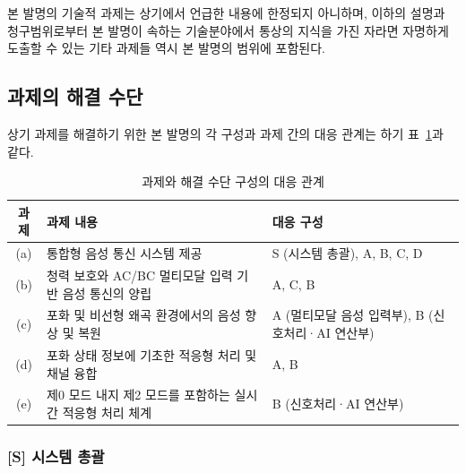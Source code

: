 \documentclass{article}
\begin{document}
본 발명의 기술적 과제는 상기에서 언급한 내용에 한정되지 아니하며, 이하의 설명과 청구범위로부터 본 발명이 속하는 기술분야에서 통상의 지식을 가진 자라면 자명하게 도출할 수 있는 기타 과제들 역시 본 발명의 범위에 포함된다.


\subsection{과제의 해결 수단}


상기 과제를 해결하기 위한 본 발명의 각 구성과 과제 간의 대응 관계는 하기 표~\ref{tab:task_solution_map}과 같다.

\begin{table}[!h]
    \centering
    \renewcommand{\arraystretch}{1.3}
    \begin{tabular}{c|l|l}
        \hline
        \textbf{과제} & \textbf{과제 내용} & \textbf{대응 구성} \\
        \hline\hline
        (a) & 통합형 음성 통신 시스템 제공 & S (시스템 총괄), A, B, C, D \\
        \hline
        (b) & 청력 보호와 AC/BC 멀티모달 입력 기반 음성 통신의 양립 & A, C, B \\
        \hline
        (c) & 포화 및 비선형 왜곡 환경에서의 음성 향상 및 복원 & A (멀티모달 음성 입력부), B (신호처리·AI 연산부) \\
        \hline
        (d) & 포화 상태 정보에 기초한 적응형 처리 및 채널 융합 & A, B \\
        \hline
        (e) & 제0 모드 내지 제2 모드를 포함하는 실시간 적응형 처리 체계 & B (신호처리·AI 연산부) \\
        \hline
    \end{tabular}
    \caption{과제와 해결 수단 구성의 대응 관계}
    \label{tab:task_solution_map}
\end{table}


\subsubsection{[S] 시스템 총괄}
\end{document}

